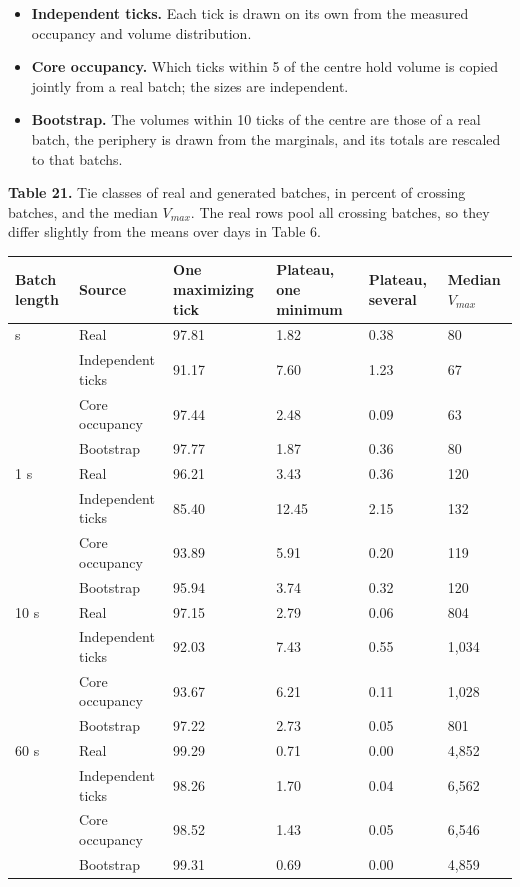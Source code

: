 \begin{itemize}
\item
  \textbf{Independent ticks.} Each tick is drawn on its own from the measured occupancy and volume distribution.
\item
  \textbf{Core occupancy.} Which ticks within 5 of the centre hold volume is copied jointly from a real batch; the sizes are independent.
\item
  \textbf{Bootstrap.} The volumes within 10 ticks of the centre are those of a real batch, the periphery is drawn from the marginals, and its totals are rescaled to that batch\textquotesingle s.
\end{itemize}

\textbf{Table 21.} Tie classes of real and generated batches, in percent of crossing batches, and the median \(V_{max}\). The real rows pool all crossing batches, so they differ slightly from the means over days in Table 6.

\begin{longtable}[]{@{}llllll@{}}
\toprule\noalign{}
Batch length & Source & One maximizing tick & Plateau, one minimum & Plateau, several & Median \(V_{max}\) \\
\midrule\noalign{}
\endhead
\bottomrule\noalign{}
\endlastfoot
0.1 s & Real & 97.81 & 1.82 & 0.38 & 80 \\
& Independent ticks & 91.17 & 7.60 & 1.23 & 67 \\
& Core occupancy & 97.44 & 2.48 & 0.09 & 63 \\
& Bootstrap & 97.77 & 1.87 & 0.36 & 80 \\
1 s & Real & 96.21 & 3.43 & 0.36 & 120 \\
& Independent ticks & 85.40 & 12.45 & 2.15 & 132 \\
& Core occupancy & 93.89 & 5.91 & 0.20 & 119 \\
& Bootstrap & 95.94 & 3.74 & 0.32 & 120 \\
10 s & Real & 97.15 & 2.79 & 0.06 & 804 \\
& Independent ticks & 92.03 & 7.43 & 0.55 & 1,034 \\
& Core occupancy & 93.67 & 6.21 & 0.11 & 1,028 \\
& Bootstrap & 97.22 & 2.73 & 0.05 & 801 \\
60 s & Real & 99.29 & 0.71 & 0.00 & 4,852 \\
& Independent ticks & 98.26 & 1.70 & 0.04 & 6,562 \\
& Core occupancy & 98.52 & 1.43 & 0.05 & 6,546 \\
& Bootstrap & 99.31 & 0.69 & 0.00 & 4,859 \\
\end{longtable}

